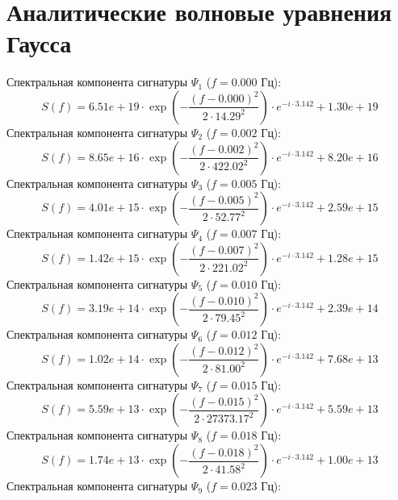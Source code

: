 \documentclass[11pt,twocolumn]{article}
\begin{document}
\section{Аналитические волновые уравнения Гаусса}
Спектральная компонента сигнатуры $\Psi_{1}$ ($f = 0.000$ Гц):
\begin{equation}
S(f) = 6.51e+19 \cdot \exp\left( -\frac{(f - 0.000)^2}{2 \cdot 14.29^2} \right) \cdot e^{-i \cdot 3.142} + 1.30e+19
\end{equation}
Спектральная компонента сигнатуры $\Psi_{2}$ ($f = 0.002$ Гц):
\begin{equation}
S(f) = 8.65e+16 \cdot \exp\left( -\frac{(f - 0.002)^2}{2 \cdot 422.02^2} \right) \cdot e^{-i \cdot 3.142} + 8.20e+16
\end{equation}
Спектральная компонента сигнатуры $\Psi_{3}$ ($f = 0.005$ Гц):
\begin{equation}
S(f) = 4.01e+15 \cdot \exp\left( -\frac{(f - 0.005)^2}{2 \cdot 52.77^2} \right) \cdot e^{-i \cdot 3.142} + 2.59e+15
\end{equation}
Спектральная компонента сигнатуры $\Psi_{4}$ ($f = 0.007$ Гц):
\begin{equation}
S(f) = 1.42e+15 \cdot \exp\left( -\frac{(f - 0.007)^2}{2 \cdot 221.02^2} \right) \cdot e^{-i \cdot 3.142} + 1.28e+15
\end{equation}
Спектральная компонента сигнатуры $\Psi_{5}$ ($f = 0.010$ Гц):
\begin{equation}
S(f) = 3.19e+14 \cdot \exp\left( -\frac{(f - 0.010)^2}{2 \cdot 79.45^2} \right) \cdot e^{-i \cdot 3.142} + 2.39e+14
\end{equation}
Спектральная компонента сигнатуры $\Psi_{6}$ ($f = 0.012$ Гц):
\begin{equation}
S(f) = 1.02e+14 \cdot \exp\left( -\frac{(f - 0.012)^2}{2 \cdot 81.00^2} \right) \cdot e^{-i \cdot 3.142} + 7.68e+13
\end{equation}
Спектральная компонента сигнатуры $\Psi_{7}$ ($f = 0.015$ Гц):
\begin{equation}
S(f) = 5.59e+13 \cdot \exp\left( -\frac{(f - 0.015)^2}{2 \cdot 27373.17^2} \right) \cdot e^{-i \cdot 3.142} + 5.59e+13
\end{equation}
Спектральная компонента сигнатуры $\Psi_{8}$ ($f = 0.018$ Гц):
\begin{equation}
S(f) = 1.74e+13 \cdot \exp\left( -\frac{(f - 0.018)^2}{2 \cdot 41.58^2} \right) \cdot e^{-i \cdot 3.142} + 1.00e+13
\end{equation}
Спектральная компонента сигнатуры $\Psi_{9}$ ($f = 0.023$ Гц):
\end{document}
